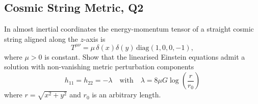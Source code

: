 \subsection{Cosmic String Metric, Q2}

In almost inertial coordinates the energy-momentum tensor of a straight cosmic string aligned along the $z$-axis is
\begin{equation}
    T^{\mu\nu} = \mu\,\delta(x)\delta(y)\,\mathrm{diag}(1,0,0,-1),
\end{equation}
where $\mu > 0$ is constant. Show that the linearised Einstein equations admit a solution with non-vanishing metric perturbation components
\begin{equation}
    h_{11} = h_{22} = -\lambda \quad \text{with} \quad \lambda = 8\mu G\log\!\left(\frac{r}{r_0}\right)
\end{equation}
where $r = \sqrt{x^2+y^2}$ and $r_0$ is an arbitrary length.

